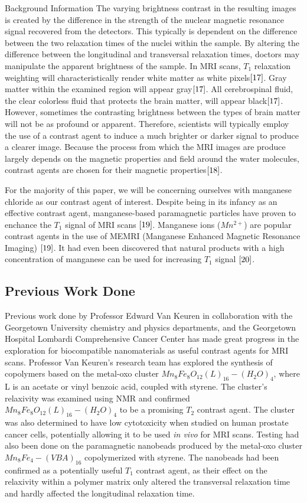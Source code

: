 \documentclass[a4paper,12pt]{article}
\begin{document}
\begin{section}{Background Information}
The varying brightness contrast in the resulting images is created by the difference in the strength of the nuclear magnetic resonance signal recovered from the detectors. This typically is dependent on the difference between the two relaxation times of the nuclei within the sample. By altering the difference between the longitudinal and transversal relaxation times, doctors may manipulate the apparent brightness of the sample. In MRI scans, $T_1$ relaxation weighting will characteristically render white matter as white pixels$\cite{17}$. Gray matter within the examined region will appear gray$\cite{17}$. All cerebrospinal fluid, the clear colorless fluid that protects the brain matter, will appear black$\cite{17}$. However, sometimes the contrasting brightness between the types of brain matter will not be as profound or apparent. Therefore, scientists will typically employ the use of a contrast agent to induce a much brighter or darker signal to produce a clearer image. Because the process from which the MRI images are produce largely depends on the magnetic properties and field around the water molecules, contrast agents are chosen for their magnetic properties$\cite{18}$. 

For the majority of this paper, we will be concerning ourselves with manganese chloride as our contrast agent of interest. Despite being in its infancy as an effective contrast agent, manganese-based paramagnetic particles have proven to enchance the $T_1$ signal of MRI scans $\cite{19}$. Manganese ions ($Mn^{2+}$) are popular contrast agents in the use of MEMRI (Manganese Enhanced Magnetic Resonance Imaging) $\cite{19}$. It had even been discovered that natural products with a high concentration of manganese can be used for increasing $T_1$ signal $\cite{20}$.

\subsection{Previous Work Done}
Previous work done by Professor Edward Van Keuren in collaboration with the Georgetown University chemistry and physics departments, and the Georgetown Hospital Lombardi Comprehensive Cancer Center has made great progress in the exploration for biocompatible nanomaterials as useful contrast agents for MRI scans. Professor Van Keuren's research team has explored the synthesis of copolymers based on the metal-oxo cluster $Mn_8 Fe_8 O_{12}(L)_{16}-(H_2 O)_4$, where L is an acetate or vinyl benzoic acid, coupled with styrene\cite[p.~9040]{1}. The cluster's relaxivity was examined using NMR and confirmed $Mn_8 Fe_8 O_{12}(L)_{16}-(H_2 O)_4$ to be a promising $T_2$ contrast agent. The cluster was also determined to have low cytotoxicity when studied on human prostate cancer cells, potentially allowing it to be used {\em in vivo} for MRI scans\cite[p.~9040]{1}. Testing had also been done on the paramagnetic nanobeads produced by the metal-oxo cluster $Mn_8 Fe_4 - (VBA)_{16}$ copolymerized with styrene. The nanobeads had been confirmed as a potentially useful $T_1$ contrast agent, as their effect on the relaxivity within a polymer matrix only altered the transversal relaxation time and hardly affected the longitudinal relaxation time\cite{1}.


\end{section}
\end{document}
